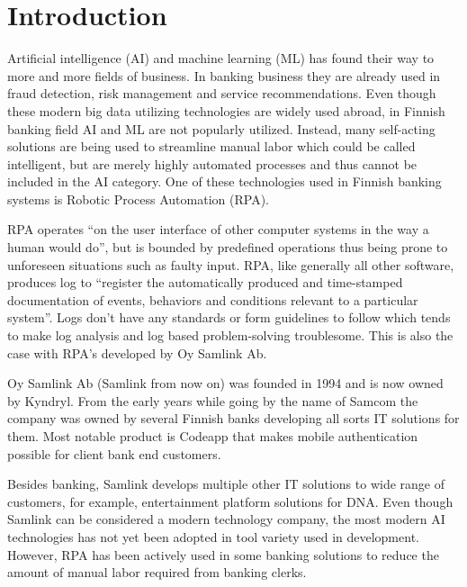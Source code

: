 
\section{Introduction}\label{sec:introduction}

\thispagestyle{empty}
Artificial intelligence (AI) and machine learning (ML)
has found their way to
more and more fields of business.
In banking business they are already used in
fraud detection, risk management and service recommendations.\cite{donepudi2017machine}
Even though these
modern big data utilizing technologies
are widely used abroad,
in Finnish banking field AI and ML are not popularly utilized.
Instead,
many self-acting solutions are being used
to streamline manual labor
which could be called intelligent,
but are merely highly automated processes
and thus cannot be included in the AI category.
One of these technologies used in Finnish banking systems
is Robotic Process Automation (RPA).

RPA operates \enquote{on the user interface of other computer systems
in the way a human would do},\cite{van2018robotic}
but is bounded by predefined operations
thus being prone to unforeseen situations
such as faulty input.
RPA, like generally all other software,
produces log to \enquote{register
the automatically produced and time-stamped documentation
of events, behaviors and conditions
relevant to a particular system}\cite{delarosa2018log}.
Logs don't have any standards or form guidelines to follow
which tends to make
log analysis and log based problem-solving troublesome.
This is also the case with RPA's developed by Oy Samlink Ab.

Oy Samlink Ab (Samlink from now on)
was founded in 1994
and is now owned by Kyndryl.
From the early years
while going by the name of Samcom
the company was owned by several Finnish banks
developing all sorts IT solutions for them.
Most notable product is Codeapp
that makes mobile authentication possible
for client bank end customers.

Besides banking,
Samlink develops multiple other IT solutions
to wide range of customers,
for example,
entertainment platform solutions for DNA\@.
Even though Samlink can be considered
a modern technology company,
the most modern AI technologies has not yet been adopted
in tool variety used in development.
However,
RPA has been actively used
in some banking solutions
to reduce the amount of manual labor required
from banking clerks.

